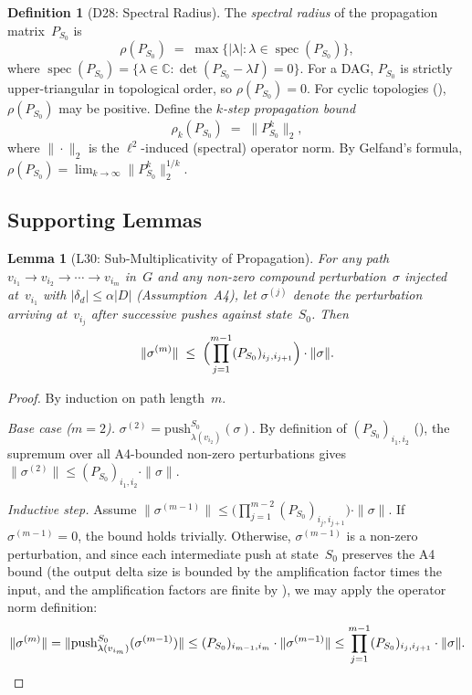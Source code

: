\documentclass[11pt,a4paper]{article}
\newtheorem{lemma}[theorem]{Lemma}
\theoremstyle{definition}
\newtheorem{definition}[theorem]{Definition}
\newcommand{\push}{\mathrm{push}}
\newcommand{\specnorm}[1]{\|#1\|_2}
\newcommand{\propmat}{P}
\newcommand{\propmatS}{\propmat_{S_0}}
\DeclareMathOperator{\spec}{spec}
\begin{document}
\begin{definition}[D28: Spectral Radius]\label{def:spectral-radius}
The \emph{spectral radius} of the propagation matrix~$\propmatS$ is
\[
  \rho(\propmatS) \;=\; \max\bigl\{|\lambda| : \lambda \in
    \spec(\propmatS)\bigr\},
\]
where $\spec(\propmatS) = \{\lambda \in \mathbb{C} :
\det(\propmatS - \lambda I) = 0\}$.
For a DAG, $\propmatS$ is strictly upper-triangular in topological order,
so $\rho(\propmatS) = 0$.
For cyclic topologies (), $\rho(\propmatS)$ may be
positive.  Define the \emph{$k$-step propagation bound}
\[
  \rho_k(\propmatS) \;=\; \specnorm{\propmatS^k},
\]
where $\specnorm{\cdot}$ is the $\ell^2$-induced (spectral) operator norm.
By Gelfand's formula,
$\rho(\propmatS) = \lim_{k \to \infty} \specnorm{\propmatS^k}^{1/k}$.
\end{definition}

\subsection{Supporting Lemmas}

\begin{lemma}[L30: Sub-Multiplicativity of Propagation]\label{lem:prop-submult}
For any path $v_{i_1} \to v_{i_2} \to \cdots \to v_{i_m}$ in~$G$ and any
non-zero compound perturbation~$\sigma$ injected at~$v_{i_1}$ with
$|\delta_d| \leq \alpha |D|$ (Assumption~A4), let $\sigma^{(j)}$ denote the
perturbation arriving at~$v_{i_j}$ after successive pushes against
state~$S_0$.  Then
\[
  \|\sigma^{(m)}\|
  \;\leq\;
  \Bigl(\prod_{j=1}^{m-1} (\propmatS)_{i_j, i_{j+1}}\Bigr) \cdot \|\sigma\|.
\]
\end{lemma}

\begin{proof}
By induction on path length~$m$.

\emph{Base case ($m = 2$).}
$\sigma^{(2)} = \push_{\lambda(v_{i_2})}^{S_0}(\sigma)$.
By definition of $(\propmatS)_{i_1, i_2}$ (), the
supremum over all A4-bounded non-zero perturbations gives
$\|\sigma^{(2)}\| \leq (\propmatS)_{i_1, i_2} \cdot \|\sigma\|$.

\emph{Inductive step.}
Assume $\|\sigma^{(m-1)}\| \leq \bigl(\prod_{j=1}^{m-2}
(\propmatS)_{i_j,i_{j+1}}\bigr) \cdot \|\sigma\|$.
If $\sigma^{(m-1)} = 0$, the bound holds trivially.
Otherwise, $\sigma^{(m-1)}$ is a non-zero perturbation, and since each
intermediate push at state~$S_0$ preserves the A4 bound (the output delta
size is bounded by the amplification factor times the input, and the
amplification factors are finite by ), we may apply the
operator norm definition:
\[
  \|\sigma^{(m)}\|
  = \|\push_{\lambda(v_{i_m})}^{S_0}(\sigma^{(m-1)})\|
  \leq (\propmatS)_{i_{m-1}, i_m} \cdot \|\sigma^{(m-1)}\|
  \leq \prod_{j=1}^{m-1} (\propmatS)_{i_j,i_{j+1}} \cdot \|\sigma\|.
  \qedhere
\]
\end{proof}
\end{document}
